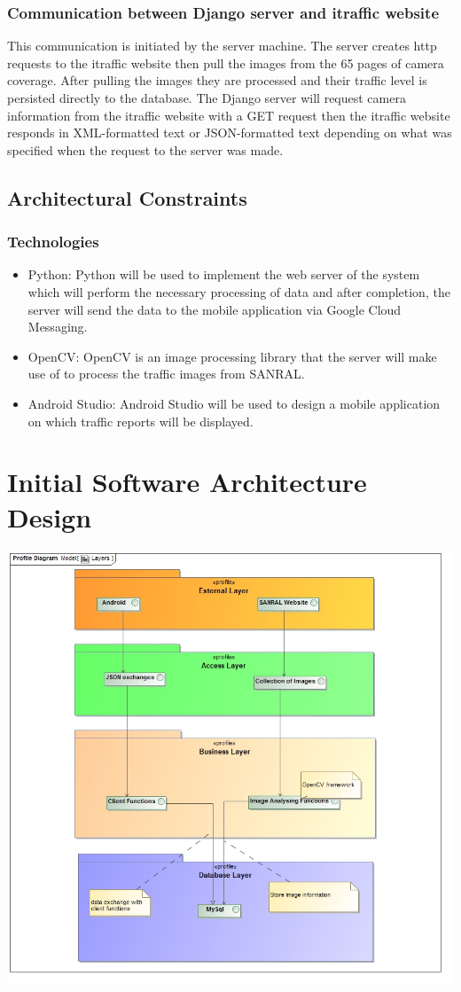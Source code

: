 \documentclass[a4paper,12pt]{article}
\begin{document}
\subsubsection{Communication between Django server and itraffic website}
This communication is initiated by the server machine. The server creates http requests to the itraffic website then pull the images from the 65 pages of camera coverage. After pulling the images they are processed and their traffic level is persisted directly to the database. The Django server will request camera information from the itraffic website with a GET request then the itraffic website responds in XML-formatted text or JSON-formatted text depending on what was specified when the request to the server was made.

\subsection{Architectural Constraints}
\subsubsection{Technologies}
\begin{itemize}
\item Python: Python will be used to implement the web server of the system which will perform the necessary processing of data and after completion, the server will send the data to the mobile application via Google Cloud Messaging.
\item OpenCV: OpenCV is an image processing library that the server will make use of to process the traffic images from SANRAL.
\item Android Studio: Android Studio will be used to design a mobile application on which traffic reports will be displayed.
\end{itemize}
\section{Initial Software Architecture Design}
\includegraphics[width=\textwidth]{Layers.jpg}
\end{document}
